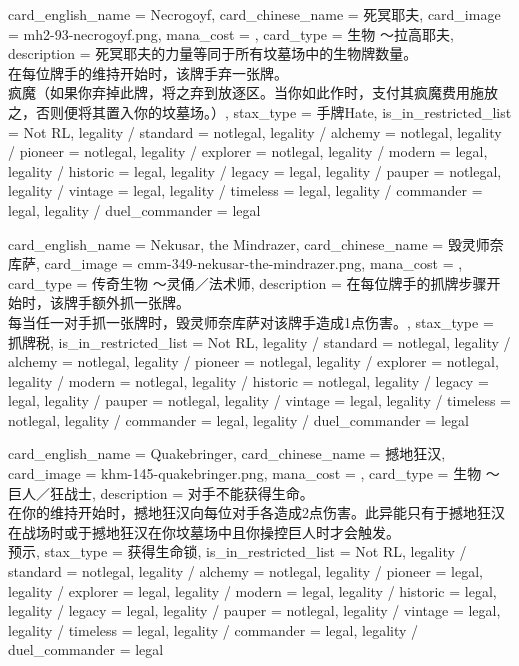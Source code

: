 \documentclass[lang = cn, color = black, 10pt]{AllThatStax}
\begin{document}
\card
{
	card_english_name = {Necrogoyf},
	card_chinese_name = {死冥耶夫},
	card_image = mh2-93-necrogoyf.png,
	mana_cost = ,
	card_type = 生物 ～拉高耶夫,
	description = {死冥耶夫的力量等同于所有坟墓场中的生物牌数量。\\
		在每位牌手的维持开始时，该牌手弃一张牌。\\
		疯魔（如果你弃掉此牌，将之弃到放逐区。当你如此作时，支付其疯魔费用施放之，否则便将其置入你的坟墓场。）},
	stax_type = 手牌Hate,
	is_in_restricted_list = Not RL,
	legality / standard = notlegal,
	legality / alchemy = notlegal,
	legality / pioneer = notlegal,
	legality / explorer = notlegal,
	legality / modern = legal,
	legality / historic = legal,
	legality / legacy = legal,
	legality / pauper = notlegal,
	legality / vintage = legal,
	legality / timeless = legal,
	legality / commander = legal,
	legality / duel_commander = legal
}

\card
{
	card_english_name = {Nekusar, the Mindrazer},
	card_chinese_name = {毁灵师奈库萨},
	card_image = cmm-349-nekusar-the-mindrazer.png,
	mana_cost = ,
	card_type = 传奇生物 ～灵俑／法术师,
	description = {在每位牌手的抓牌步骤开始时，该牌手额外抓一张牌。\\
		每当任一对手抓一张牌时，毁灵师奈库萨对该牌手造成1点伤害。},
	stax_type = 抓牌税,
	is_in_restricted_list = Not RL,
	legality / standard = notlegal,
	legality / alchemy = notlegal,
	legality / pioneer = notlegal,
	legality / explorer = notlegal,
	legality / modern = notlegal,
	legality / historic = notlegal,
	legality / legacy = legal,
	legality / pauper = notlegal,
	legality / vintage = legal,
	legality / timeless = notlegal,
	legality / commander = legal,
	legality / duel_commander = legal
}

\card
{
	card_english_name = {Quakebringer},
	card_chinese_name = {撼地狂汉},
	card_image = khm-145-quakebringer.png,
	mana_cost = ,
	card_type = 生物 ～巨人／狂战士,
	description = {对手不能获得生命。\\
		在你的维持开始时，撼地狂汉向每位对手各造成2点伤害。此异能只有于撼地狂汉在战场时或于撼地狂汉在你坟墓场中且你操控巨人时才会触发。\\
		预示},
	stax_type = 获得生命锁,
	is_in_restricted_list = Not RL,
	legality / standard = notlegal,
	legality / alchemy = notlegal,
	legality / pioneer = legal,
	legality / explorer = legal,
	legality / modern = legal,
	legality / historic = legal,
	legality / legacy = legal,
	legality / pauper = notlegal,
	legality / vintage = legal,
	legality / timeless = legal,
	legality / commander = legal,
	legality / duel_commander = legal
}
\end{document}
